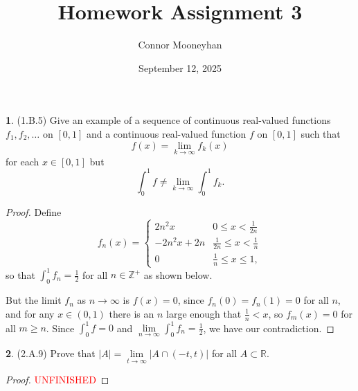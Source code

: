 \documentclass[12pt]{article}
\title{Homework Assignment 3}
\author{Connor Mooneyhan}
\date{September 12, 2025}
\theoremstyle{definition}
\newtheorem{ex}{}
\begin{document}
\maketitle

\begin{ex}
	(1.B.5)
	Give an example of a sequence of continuous real-valued functions $f_1, f_2, \dots$ on $[0, 1]$ and a continuous real-valued function $f$ on $[0,1]$ such that \begin{equation*}
		f(x) = \lim_{k \to \infty} f_k(x)
	\end{equation*}
	for each $x \in [0, 1]$ but \begin{equation*}
		\int_0^1 f \neq \lim_{k \to \infty} \int_0^1 f_k.
	\end{equation*}
\end{ex}
\begin{proof}
	Define \begin{equation*}
		f_n(x) = \begin{cases}
			2n^2x       & 0 \leq x < \frac{1}{2n}           \\
			-2n^2x + 2n & \frac{1}{2n} \leq x < \frac{1}{n} \\
			0           & \frac{1}{n} \leq x \leq 1,
		\end{cases}
	\end{equation*}
  so that $\int_0^1 f_n = \frac{1}{2}$ for all $n \in \mathbb{Z}^+$ as shown below.
	\begin{center}
	\end{center}
  But the limit $f_n$ as $n \to \infty$ is $f(x) = 0$, since $f_n(0) = f_n(1) = 0$ for all $n$, and for any $x \in (0, 1)$ there is an $n$ large enough that $\frac{1}{n} < x$, so $f_m(x) = 0$ for all $m \geq n$.
  Since $\int_0^1 f = 0$ and $\lim\limits_{n \to \infty} \int_0^1 f_n = \frac{1}{2}$, we have our contradiction.
\end{proof}

\begin{ex}
	(2.A.9)
	Prove that $|A| = \lim\limits_{t \to \infty}|A \cap (-t, t)|$ for all $A \subset \mathbb{R}$.
\end{ex}
\begin{proof}
	\textcolor{red}{UNFINISHED}
  
\end{proof}
\end{document}
